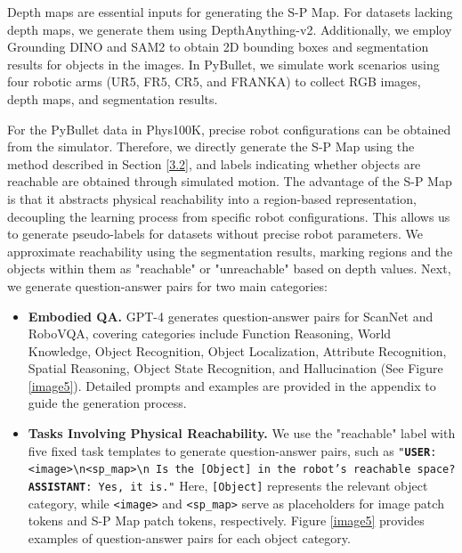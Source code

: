 \documentclass[10pt,twocolumn,letterpaper]{article}
\begin{document}
Depth maps are essential inputs for generating the S-P Map. For datasets lacking depth maps, we generate them using DepthAnything-v2. Additionally, we employ Grounding DINO \cite{groundingdino} and SAM2 \cite{sam2} to obtain 2D bounding boxes and segmentation results for objects in the images. In PyBullet, we simulate work scenarios using four robotic arms (UR5, FR5, CR5, and FRANKA) to collect RGB images, depth maps, and segmentation results.

For the PyBullet data in Phys100K, precise robot configurations can be obtained from the simulator. Therefore, we directly generate the S-P Map using the method described in Section \ref{3.2}, and labels indicating whether objects are reachable are obtained through simulated motion. The advantage of the S-P Map is that it abstracts physical reachability into a region-based representation, decoupling the learning process from specific robot configurations. This allows us to generate pseudo-labels for datasets without precise robot parameters. We approximate reachability using the segmentation results, marking regions and the objects within them as "reachable" or "unreachable" based on depth values. Next, we generate question-answer pairs for two main categories:

\begin{itemize}
\item \textbf{Embodied QA.} GPT-4 generates question-answer pairs for ScanNet and RoboVQA, covering categories include Function Reasoning, World Knowledge, Object Recognition, Object Localization, Attribute Recognition, Spatial Reasoning,  Object State Recognition, and Hallucination (See Figure \ref{image5}). Detailed prompts and examples are provided in the appendix to guide the generation process.
\item \textbf{Tasks Involving Physical Reachability.} We use the "reachable" label with five fixed task templates to generate question-answer pairs, such as \texttt{"\textbf{USER}:\textless image\textgreater\textbackslash n\textless sp\_map\textgreater\textbackslash n Is the [Object] in the robot's reachable space? \textbf{ASSISTANT}: Yes, it is."} Here, \texttt{[Object]} represents the relevant object category, while \texttt{\textless image\textgreater} and \texttt{\textless sp\_map\textgreater} serve as placeholders for image patch tokens and S-P Map patch tokens, respectively. Figure \ref{image5} provides examples of question-answer pairs for each object category.
\end{itemize}
\end{document}
